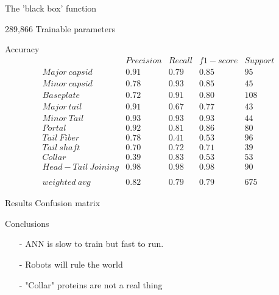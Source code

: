 \documentclass{beamer}
\begin{document}
\begin{frame}{The 'black box' function}
 \\
\begin{center}
289,866 Trainable parameters
\end{center}
\end{frame}

\begin{frame}{Accuracy}
$$
\begin{matrix}
 & Precision & Recall & f1-score & Support\\ 
Major\ capsid & 0.91 & 0.79 & 0.85 & 95\\ 
Minor\ capsid & 0.78 & 0.93 & 0.85 & 45\\ 
Baseplate & 0.72 & 0.91 & 0.80 & 108\\ 
Major\ tail & 0.91 & 0.67 & 0.77 & 43\\ 
Minor\ Tail & 0.93 & 0.93 & 0.93 & 44\\ 
Portal & 0.92 & 0.81 & 0.86 & 80\\ 
Tail\ Fiber & 0.78 & 0.41 & 0.53 & 96\\  
Tail\ shaft & 0.70 & 0.72 & 0.71 & 39\\ 
Collar & 0.39 & 0.83 & 0.53 & 53\\ 
Head-Tail\ Joining & 0.98 & 0.98 & 0.98 & 90\\ 
 &  &  &  & \\ 
weighted\ avg & 0.82 & 0.79 & 0.79 & 675 
\end{matrix}
$$
\end{frame}

\begin{frame}{Results Confusion matrix}
\end{frame}


\begin{frame}{Conclusions}
\begin{itemize}
\item [-] ANN is slow to train but fast to run.
\item [-] Robots will rule the world
\item [-] "Collar" proteins are not a real thing
\end{itemize}
\end{frame}
\end{document}
